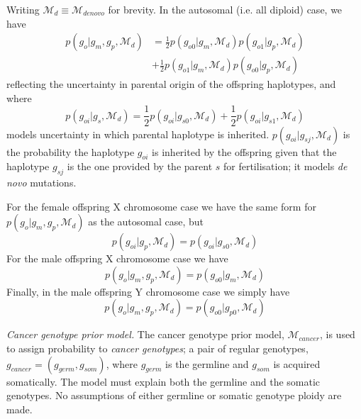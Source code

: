 \documentclass[notitlepage, twocolumn, 10pt]{article}
\begin{document}
Writing $\mathcal{M}_{d} \equiv \mathcal{M}_{denovo}$ for brevity. In the autosomal (i.e. all diploid) case, we have
\begin{align*}
    p(g_o | g_m, g_p, \mathcal{M}_{d}) &= \frac{1}{2} p(g_{o0} | g_m, \mathcal{M}_{d})p(g_{o1} | g_p, \mathcal{M}_{d}) \\ &+ \frac{1}{2} p(g_{o1} | g_m, \mathcal{M}_{d}) p(g_{o0} |g_p, \mathcal{M}_{d})
\end{align*}
reflecting the uncertainty in parental origin of the offspring haplotypes, and where
\begin{equation*}
p(g_{oi} |g_s, \mathcal{M}_{d}) = \frac{1}{2} p(g_{oi} | g_{s0}, \mathcal{M}_{d}) + \frac{1}{2} p(g_{oi} | g_{s1}, \mathcal{M}_{d})
\end{equation*}
models uncertainty in which parental haplotype is inherited. $p(g_{oi} | g_{sj}, \mathcal{M}_{d})$ is the probability the haplotype $g_{oi}$ is inherited by the offspring given that the haplotype $g_{sj}$ is the one provided by the parent $s$ for fertilisation; it models \textit{de novo} mutations.

For the female offspring X chromosome case we have the same form for $p(g_o | g_m, g_p, \mathcal{M}_{d})$ as the autosomal case, but
\begin{equation*}
p(g_{oi} | g_p, \mathcal{M}_{d}) = p(g_{oi} | g_{s0}, \mathcal{M}_{d})
\end{equation*}
For the male offspring X chromosome case we have
\begin{equation*}
 p(g_o | g_m, g_p, \mathcal{M}_{d}) = p(g_{o0} | g_m, \mathcal{M}_{d})
\end{equation*}
Finally, in the male offspring Y chromosome case we simply have
\begin{equation*}
 p(g_o | g_m, g_p, \mathcal{M}_{d}) = p(g_{o0} | g_{p0}, \mathcal{M}_{d})
\end{equation*}

\vspace{3mm}
\noindent\emph{Cancer genotype prior model.} The cancer genotype prior model, $\mathcal{M}_{cancer}$, is used to assign probability to \emph{cancer genotypes}; a pair of regular genotypes, $g_{cancer} = (g_{germ}, g_{som})$, where $g_{germ}$ is the germline and $g_{som}$ is acquired somatically. The model must explain both the germline and the somatic genotypes. No assumptions of either germline or somatic genotype ploidy are made.
\end{document}

